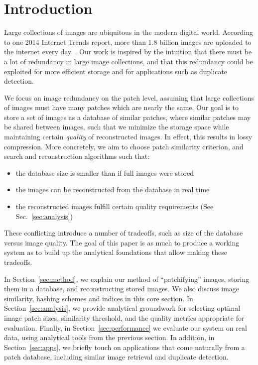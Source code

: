 \section{Introduction}

Large collections of images are ubiquitous in the modern digital world.
According to one 2014 Internet Trends report,
more than 1.8 billion images are uploaded to the internet every day~\cite{meeker2014internet}.
Our work is inspired by the intuition that there must be a lot of redundancy
in large image collections, and that this redundancy could
be exploited for more efficient storage and for applications such as duplicate detection.

We focus on image redundancy on the patch level, assuming that large collections
of images must have many patches which are nearly the same.
Our goal is to store a set of images as a database of
similar patches, where similar patches may be shared between images,
 such that we minimize the storage space while maintaining certain \emph{quality}
of reconstructed images. In effect, this results in lossy compression. More concretely,
we aim to choose patch similarity criterion, and search and reconstruction algorithms such
that:
\begin{itemize}
\item the database size is smaller than if full images were stored
\item the images can be reconstructed from the database in real time
\item the reconstructed images fulfill certain quality requirements (See Sec.~\ref{sec:analysis})
\end{itemize}
These conflicting introduce a number of tradeoffs, such as size of
the database versus image quality.
The goal of this paper is as much to produce a working system as to
build up the analytical foundations that allow making these tradeoffs.

In Section~\ref{sec:method}, we explain our method of ``patchifying'' images,
storing them in a database, and reconstructing stored images. We also
discuss image similarity, hashing schemes and indices in this core section.
In Section~\ref{sec:analysis}, we provide analytical groundwork for
selecting optimal image patch sizes, similarity threshold, and the quality metrics
appropriate for evaluation. Finally, in Section~\ref{sec:performance}
we evaluate our system on real data, using analytical tools from the previous section.
In addition, in Section~\ref{sec:apps}, we briefly touch on applications that come naturally
from a patch database, including similar image retrieval and duplicate detection.
